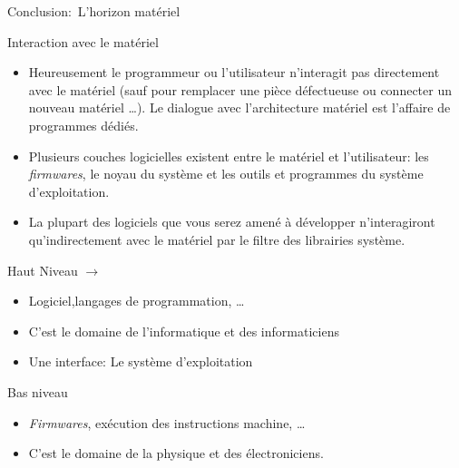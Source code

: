 \begin{frame}{Conclusion:~L'horizon matériel}
  \begin{block}{Interaction avec le matériel}
    \begin{itemize}
    \item Heureusement le programmeur ou l'utilisateur n'interagit pas
      directement avec le matériel (sauf pour remplacer une pièce
      défectueuse ou connecter un nouveau matériel \dots). Le dialogue
      avec l'architecture matériel est l'affaire de programmes dédiés.
    \item Plusieurs couches logicielles existent entre le matériel et
      l'utilisateur: les \textit{firmwares}, le noyau du système et les
      outils et programmes du système d'exploitation.
    \item La plupart des logiciels que vous serez amené à développer
      n'interagiront qu'indirectement avec le matériel par le filtre des
      librairies système.
    \end{itemize}
  \end{block}
  \begin{alertblock}{Haut Niveau $\rightarrow$}
    \begin{itemize}
    \item Logiciel,langages de programmation, \dots
    \item[\dialoginformation] C'est le domaine de l'informatique et des informaticiens
    \item[\dialogsystem] Une interface: Le système d'exploitation
    \end{itemize}
  \end{alertblock}
  \begin{alertblock}{Bas niveau}
    \begin{itemize}
    \item \textit{Firmwares}, exécution des instructions machine,
      \dots
    \item C'est le domaine de la physique et des électroniciens.
    \end{itemize}
  \end{alertblock}
\end{frame}
\endinput

\section{Le système d'exploitation}
\begin{frame}{Plan}
  \tableofcontents[hideothersubsections,sections={1-4}]
\end{frame}
\label{sec:OSGeneralites}
